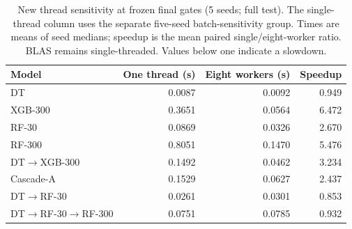 \begin{table}[!htbp]
\centering
\caption{New thread sensitivity at frozen final gates (5 seeds; full test). The single-thread column uses the separate five-seed batch-sensitivity group. Times are means of seed medians; speedup is the mean paired single/eight-worker ratio. BLAS remains single-threaded. Values below one indicate a slowdown.}
\label{tab:parallel}
\small
\setlength{\tabcolsep}{4pt}
\begin{tabularx}{\textwidth}{@{}Xrrr@{}}
\toprule
Model & One thread (s) & Eight workers (s) & Speedup \\
\midrule
DT & 0.0087 & 0.0092 & 0.949 \\
XGB-300 & 0.3651 & 0.0564 & 6.472 \\
RF-30 & 0.0869 & 0.0326 & 2.670 \\
RF-300 & 0.8051 & 0.1470 & 5.476 \\
DT$\to$XGB-300 & 0.1492 & 0.0462 & 3.234 \\
Cascade-A & 0.1529 & 0.0627 & 2.437 \\
DT$\to$RF-30 & 0.0261 & 0.0301 & 0.853 \\
DT$\to$RF-30$\to$RF-300 & 0.0751 & 0.0785 & 0.932 \\
\bottomrule
\end{tabularx}
\end{table}

